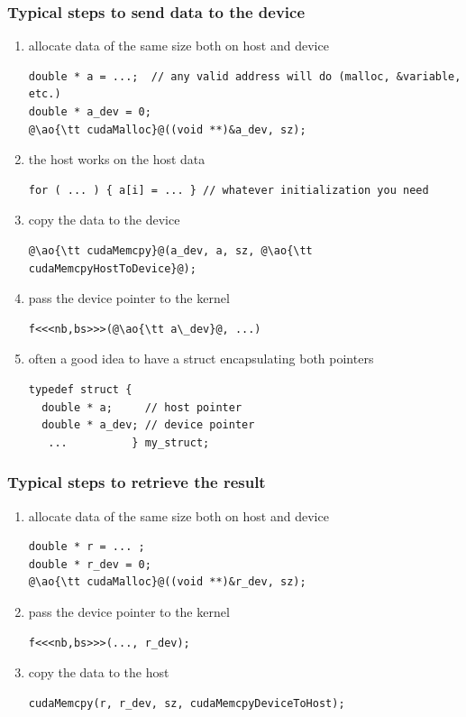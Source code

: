\documentclass[12pt,dvipdfmx]{beamer}
\newcommand{\ao}[1]{{\color{blue}#1}}
\begin{document}
\begin{frame}[fragile]
\frametitle{Typical steps to send data to the device}
\begin{enumerate}
\item allocate data of the same size both on host and device
\begin{lstlisting}
double * a = ...;  // any valid address will do (malloc, &variable, etc.)
double * a_dev = 0;
@\ao{\tt cudaMalloc}@((void **)&a_dev, sz);
\end{lstlisting}

\item the host works on the host data
\begin{lstlisting}
for ( ... ) { a[i] = ... } // whatever initialization you need
\end{lstlisting}

\item copy the data to the device
\begin{lstlisting}
@\ao{\tt cudaMemcpy}@(a_dev, a, sz, @\ao{\tt cudaMemcpyHostToDevice}@);
\end{lstlisting}

\item pass the device pointer to the kernel 
\begin{lstlisting}
f<<<nb,bs>>>(@\ao{\tt a\_dev}@, ...)
\end{lstlisting}

\item often a good idea to have
  a struct encapsulating both pointers
  {\small
\begin{lstlisting}
typedef struct {
  double * a;     // host pointer
  double * a_dev; // device pointer
   ...          } my_struct;
\end{lstlisting}}
\end{enumerate}
\end{frame}

\begin{frame}[fragile]
\frametitle{Typical steps to retrieve the result}
\begin{enumerate}
\item allocate data of the same size both on host and device
\begin{lstlisting}
double * r = ... ;
double * r_dev = 0;
@\ao{\tt cudaMalloc}@((void **)&r_dev, sz);
\end{lstlisting}

\item pass the device pointer to the kernel 
\begin{lstlisting}
f<<<nb,bs>>>(..., r_dev);
\end{lstlisting}

\item copy the data to the host
\begin{lstlisting}
cudaMemcpy(r, r_dev, sz, cudaMemcpyDeviceToHost);
\end{lstlisting}
\end{enumerate}
\end{frame}
\end{document}
